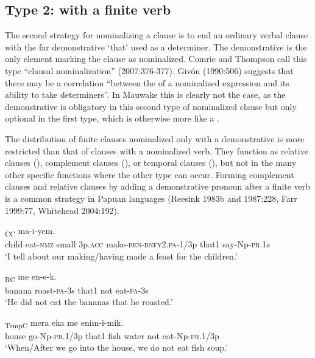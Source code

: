 \subsection{Type 2: with a finite verb}
\hypertarget{RefHeading22281935131865}{}
The second strategy for nominalizing a clause is to end an ordinary verbal clause with the far demonstrative  `that' used as a determiner. The demonstrative is the only element marking the clause as nominalized. Comrie and Thompson call this type ``clausal nominalization'' (2007:376-377). Giv\'on (1990:506) suggests that there may be a correlation ``between the  of a nominalized expression and its ability to take determiners''. In Mauwake this is clearly not the case, as the demonstrative is obligatory in this second type of nominalized clause but only optional in the first type, which is otherwise more like a .

The distribution of finite clauses nominalized only with a demonstrative is more restricted than that of clauses with a nominalized verb. They function as relative clauses (), complement clauses (), or temporal clauses (), but not in the many other specific functions where the other type can occur. Forming complement clauses and relative clauses by adding a demonstrative pronoun after a finite verb is a common strategy in Papuan languages (Reesink 1983b and 1987:228, Farr 1999:77, Whitehead 2004:192). 

\ea%
\label{ex:x1260}
\textsubscript{CC}  ma-i-yem.
 \\
     child  eat-\textsc{nmz}  small  3p.\textsc{acc}  make-\textsc{ben}-\textsc{bnfy}2.\textsc{pa}-1/3p that1  say-Np-\textsc{pr}.1s \\
\glt `I tell about our making/having made a feast for the children.'
\z

\ea%
\label{ex:x1261}
\textsubscript{RC}  me  en-e-k. \\
     banana  roast-\textsc{pa}-3s  that1  not  eat-\textsc{pa}-3s \\
\glt `He did not eat the bananas that he roasted.'
\z

\ea%
\label{ex:x1940}
\textsubscript{TempC}  mera  eka  me  enim-i-mik. \\
     house  go-Np-\textsc{pr}.1/3p  that1  fish  water  not  eat-Np-\textsc{pr}.1/3p \\
\glt `When/After we go into the house, we do not eat fish soup.'
\z
